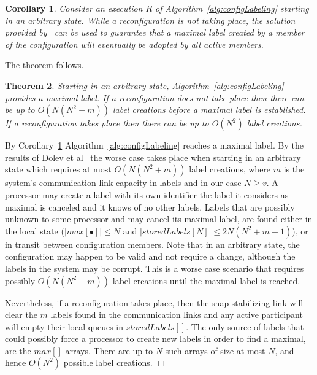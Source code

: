 \documentclass[11pt]{article}
\newtheorem{theorem}{Theorem}[section]
\newtheorem{corollary}[theorem]{Corollary}
\newenvironment{proof}{\noindent{\bf Proof.}}{\hfill$\Box$}
\begin{document}
\begin{corollary}
\label{thL:maxReached}
Consider an execution $R$ of Algorithm~\ref{alg:configLabeling} starting in an arbitrary state.  
While a reconfiguration is not taking place, the solution provided by~\cite{SSVS} can be used to guarantee that a maximal label created by a member of the configuration will eventually be adopted by all active members.
\end{corollary}

\noindent The theorem follows. 

\begin{theorem}
\label{thL:finalApp}
\label{thL:uniqueLabel}
Starting in an arbitrary state, Algorithm~\ref{alg:configLabeling} provides a maximal label. If a reconfiguration does not take place then there can be up to $O(N(N^2+m))$ label creations before a maximal label is established. If a reconfiguration takes place then there can be up to $O(N^2)$ label creations.
\end{theorem}

\begin{proof}
By Corollary~\ref{thL:maxReached} Algorithm~\ref{alg:configLabeling} reaches a maximal label.
By the results of Dolev et al~\cite{SSVS} the worse case takes place when starting in an arbitrary state which requires at most $O(N(N^2+m))$ label creations, where $m$ is the system's communication link capacity in labels and in our case $N \geq v$.
A processor may create a label with its own identifier the label it considers as maximal is canceled and it knows of no other labels.
Labels that are possibly unknown to some processor and may cancel its maximal label, are found either in the local state ($|max[\bullet]| \leq N$  and $|storedLabels[N]| \leq 2N(N^2 + m-1)$), or in transit between configuration members.
Note that in an arbitrary state, the configuration may happen to be valid and not require a change, although the labels in the system may be corrupt.
This is a worse case scenario that requires possibly $O(N(N^2+m))$ label creations until the maximal label is reached.

Nevertheless, if a reconfiguration takes place, then the snap stabilizing link will clear the $m$ labels found in the communication links and any active participant will empty their local queues in $storedLabels[]$. 
The only source of labels that could possibly force a processor to create new labels in order to find a maximal, are the $max[]$ arrays.
There are up to $N$ such arrays of size at most $N$, and hence $O(N^2)$ possible label creations.
\end{proof}
\end{document}
